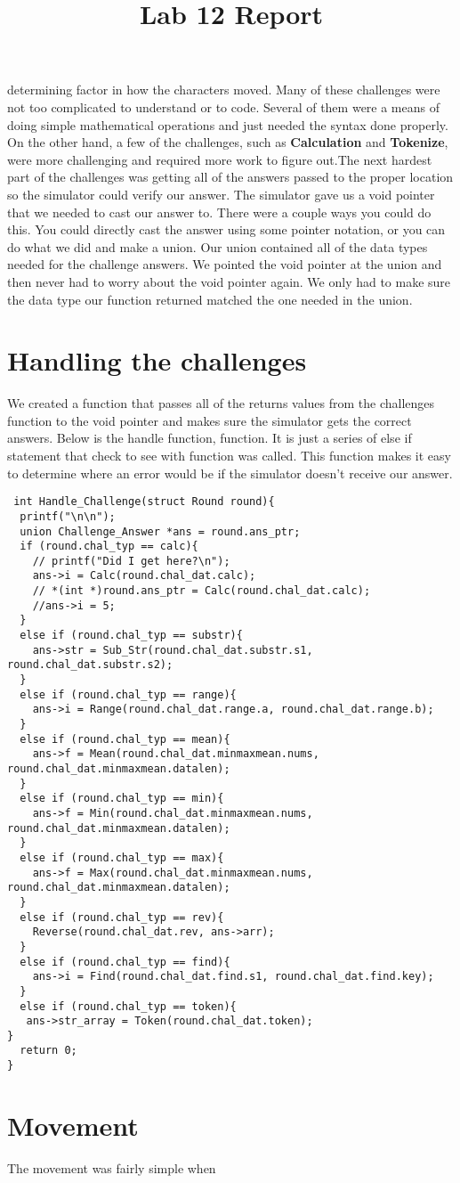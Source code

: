 \documentclass{article} \usepackage[utf8]{inputenc} \title{Lab 12 Report}
\begin{document}
determining factor in how the characters moved. Many of these challenges 
were not too complicated to understand or to code. Several of them were a 
means of doing simple mathematical operations and just needed the syntax 
done properly. On the other hand, a few of the challenges, such as 
\textbf{Calculation} and \textbf{Tokenize}, were more challenging and 
required more work to figure out.\newline \indent The next hardest part of 
the challenges was getting all of the answers passed to the proper 
location so the simulator could verify our answer. The simulator gave us a 
void pointer that we needed to cast our answer to. There were a couple 
ways you could do this. You could directly cast the answer using some 
pointer notation, or you can do what we did and make a union. Our union 
contained all of the data types needed for the challenge answers. We 
pointed the void pointer at the union and then never had to worry about 
the void pointer again. We only had to make sure the data type our 
function returned matched the one needed in the union. \section*{Handling 
the challenges} We created a function that passes all of the returns 
values from the challenges function to the void pointer and makes sure the 
simulator gets the correct answers. Below is the handle function, 
function. It is just a series of else if statement that check to see with 
function was called. This function makes it easy to determine where an 
error would be if the simulator doesn't receive our answer. 
\begin{lstlisting} int Handle_Challenge(struct Round round){
  printf("\n\n");
  union Challenge_Answer *ans = round.ans_ptr;
  if (round.chal_typ == calc){
    // printf("Did I get here?\n");
    ans->i = Calc(round.chal_dat.calc);
    // *(int *)round.ans_ptr = Calc(round.chal_dat.calc);
    //ans->i = 5;
  }
  else if (round.chal_typ == substr){
    ans->str = Sub_Str(round.chal_dat.substr.s1, 
round.chal_dat.substr.s2);
  }
  else if (round.chal_typ == range){
    ans->i = Range(round.chal_dat.range.a, round.chal_dat.range.b);
  }
  else if (round.chal_typ == mean){
    ans->f = Mean(round.chal_dat.minmaxmean.nums, 
round.chal_dat.minmaxmean.datalen);
  }
  else if (round.chal_typ == min){
    ans->f = Min(round.chal_dat.minmaxmean.nums, 
round.chal_dat.minmaxmean.datalen);
  }
  else if (round.chal_typ == max){
    ans->f = Max(round.chal_dat.minmaxmean.nums, 
round.chal_dat.minmaxmean.datalen);
  }
  else if (round.chal_typ == rev){
    Reverse(round.chal_dat.rev, ans->arr);
  }
  else if (round.chal_typ == find){
    ans->i = Find(round.chal_dat.find.s1, round.chal_dat.find.key);
  }
  else if (round.chal_typ == token){
   ans->str_array = Token(round.chal_dat.token);
}
  return 0;
}
\end{lstlisting} \section*{Movement} The movement was fairly simple when 
\end{document}
